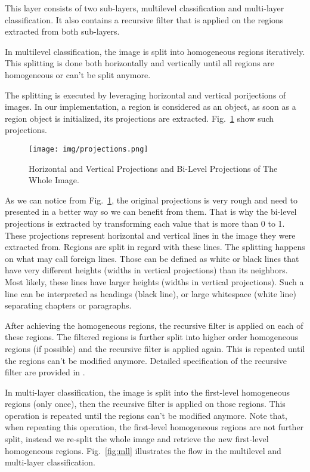 \documentclass[conference]{IEEEtran}
\begin{document}
    This layer consists of two sub-layers, multilevel classification and multi-layer classification.
    It also contains a recursive filter that is applied on the regions extracted from both sub-layers.

    In multilevel classification, the image is split into homogeneous regions iteratively.
    This splitting is done both horizontally and vertically until all regions are homogeneous or can't
    be split anymore.

    The splitting is executed by leveraging horizontal and vertical porijections of images. In our
    implementation, a region is considered as an object, as soon as a region object is initialized,
    its projections are extracted. Fig.~\ref{img:projections} show such projections.

    \begin{figure}[htbp]
        \centerline{\texttt{[image: img/projections.png]}}
        \caption{Horizontal and Vertical Projections and Bi-Level Projections of The Whole Image.}
        \label{img:projections}
    \end{figure}

    As we can notice from Fig.~\ref{img:projections}, the original projections is very rough and need to
    presented in a better way so we can benefit from them.
    That is why the bi-level projections is extracted by transforming each value that is more than 0 to 1.
    These projections represent horizontal and vertical lines in the image they were extracted from.
    Regions are split in regard with these lines. The splitting happens on what may call foreign lines.
    Those can be defined as white or black lines that have very different heights (widths in vertical projections)
    than its neighbors. Most likely, these lines have larger heights (widths in vertical projections). Such a line
    can be interpreted as headings (black line), or large whitespace (white line) separating chapters or paragraphs.

    After achieving the homogeneous regions, the recursive filter is applied on each of these regions.
    The filtered regions is further split into higher order homogeneous regions (if possible) and the
    recursive filter is applied again. This is repeated until the regions can't be modified anymore.
    Detailed specification of the recursive filter are provided in \cite{mha}.

    In multi-layer classification, the image is split into the first-level homogeneous regions (only once),
    then the recursive filter is applied on those regions. This operation is repeated until the regions
    can't be modified anymore.
    Note that, when repeating this operation, the first-level homogeneous regions are not further split,
    instead we re-split the whole image and retrieve the new first-level homogeneous regions.
    Fig.~\ref{fig:mll} illustrates the flow in the multilevel and multi-layer classification.
\end{document}
